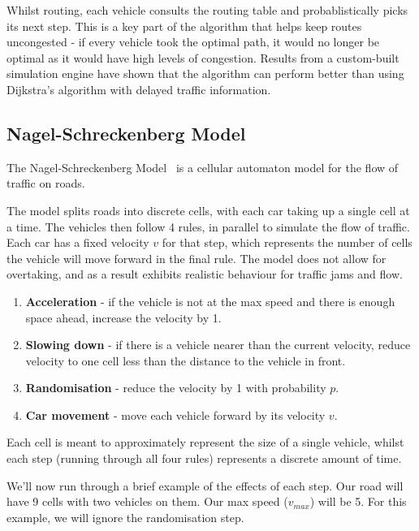 \documentclass[ %
                    author={Alexander Hill},
                supervisor={Dr. Benjamin Sach},
                    degree={MEng},
                     title={MARMOSET},
                  subtitle={Multi-Agent Route Management using Online Simulation for Efficient Transportation},
                      type={research},
                      year={2016} ]{dissertation}
\begin{document}
Whilst routing, each vehicle consults the routing table and probablistically
picks its next step. This is a key part of the algorithm that helps keep routes
uncongested - if every vehicle took the optimal path, it would no longer be
optimal as it would have high levels of congestion. Results from a custom-built
simulation engine have shown that the algorithm can perform better than using
Dijkstra's algorithm with delayed traffic information.

\subsection{Nagel-Schreckenberg Model} \label{sec:nagel}

The Nagel-Schreckenberg Model~\cite{nagel} is a cellular automaton model for the
flow of traffic on roads.

The model splits roads into discrete cells, with each car taking up a single
cell at a time. The vehicles then follow 4 rules, in parallel to simulate the
flow of traffic. Each car has a fixed velocity $v$ for that step, which
represents the number of cells the vehicle will move forward in the final rule.
The model does not allow for overtaking, and as a result exhibits realistic
behaviour for traffic jams and flow.

\begin{enumerate}
    \item \textbf{Acceleration} - if the vehicle is not at the max speed and
        there is enough space ahead, increase the velocity by 1.
    \item \textbf{Slowing down} - if there is a vehicle nearer than the current
        velocity, reduce velocity to one cell less than the distance to the
        vehicle in front.
    \item \textbf{Randomisation} - reduce the velocity by 1 with probability
        $p$.
    \item \textbf{Car movement} - move each vehicle forward by its velocity $v$.
\end{enumerate}

Each cell is meant to approximately represent the size of a single vehicle,
whilst each step (running through all four rules) represents a discrete amount
of time.

We'll now run through a brief example of the effects of each step. Our road will
have 9 cells with two vehicles on them. Our max speed ($v_{max}$) will be 5.
For this example, we will ignore the randomisation step.
\end{document}
